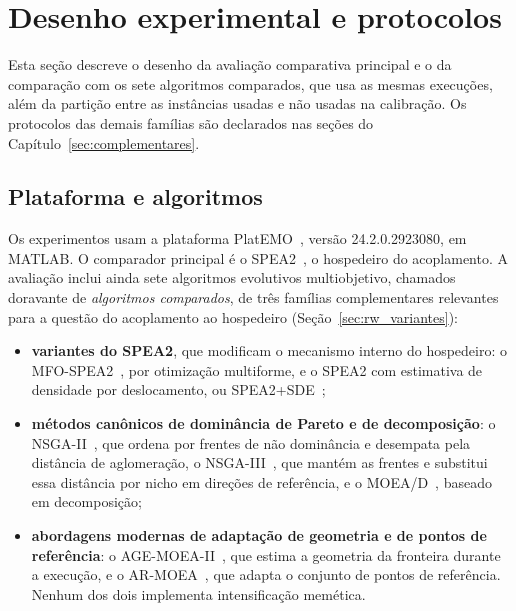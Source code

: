 \section{Desenho experimental e protocolos}
\label{sec:desenho}

Esta seção descreve o desenho da avaliação comparativa principal e o da comparação com os sete algoritmos comparados, que usa as mesmas execuções, além da partição entre as instâncias usadas e não usadas na calibração. Os protocolos das demais famílias são declarados nas seções do Capítulo~\ref{sec:complementares}.

\subsection{Plataforma e algoritmos}
\label{sec:plataforma}

Os experimentos usam a plataforma PlatEMO~\cite{platemo}, versão 24.2.0.2923080, em MATLAB. O comparador principal é o SPEA2~\cite{zitzler2001spea2}, o hospedeiro do acoplamento. A avaliação inclui ainda sete algoritmos evolutivos multiobjetivo, chamados doravante de \emph{algoritmos comparados}, de três famílias complementares relevantes para a questão do acoplamento ao hospedeiro (Seção~\ref{sec:rw_variantes}):

\begin{itemize}
    \item \textbf{variantes do SPEA2}, que modificam o mecanismo interno do hospedeiro: o MFO-SPEA2~\cite{jiao2023multiform}, por otimização multiforme, e o SPEA2 com estimativa de densidade por deslocamento, ou SPEA2+SDE~\cite{li2014shift};
    \item \textbf{métodos canônicos de dominância de Pareto e de decomposição}: o NSGA-II~\cite{deb2002fast}, que ordena por frentes de não dominância e desempata pela distância de aglomeração, o NSGA-III~\cite{deb2014nsga3}, que mantém as frentes e substitui essa distância por nicho em direções de referência, e o MOEA/D~\cite{zhang2007moead}, baseado em decomposição;
    \item \textbf{abordagens modernas de adaptação de geometria e de pontos de referência}: o AGE-MOEA-II~\cite{panichella2022agemoeaii}, que estima a geometria da fronteira durante a execução, e o AR-MOEA~\cite{tian2018armoea}, que adapta o conjunto de pontos de referência. Nenhum dos dois implementa intensificação memética.
\end{itemize}

